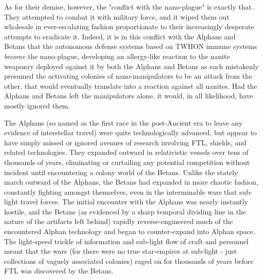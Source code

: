 As for their demise, however, the "conflict with the nano-plague" is
exactly that. They attempted to combat it with military force, and it
wiped them out wholesale in ever-escalating fashion proportionate to
their increasingly desperate attempts to eradicate it. Indeed, it is
in this conflict with the Alphans and Betans that the autonomous
defense systems based on TWHON immune systems {\em become} the
nano-plague, developing an allergy-like reaction to the nanite
weaponry deployed against it by both the Alphans and Betans as each
mistakenly presumed the activating colonies of nano-manipulators to be
an attack from the other, that would eventually translate into a
reaction against all nanites. Had the Alphans and Betans left the
manipulators alone, it would, in all likelihood, have mostly ignored
them.

The Alphans (so named as the first race in the post-Ancient era to
leave any evidence of interstellar travel) were quite technologically
advanced, but appear to have simply missed or ignored avenues of
research involving FTL, shields, and related technologies. They
expanded outward in relativistic vessels over tens of thousands of
years, eliminating or curtailing any potential competition without
incident until encountering a colony world of the Betans. Unlike the
stately march outward of the Alphans, the Betans had expanded in more
chaotic fashion, constantly fighting amongst themselves, even in the
interminable wars that sub-light travel forces. The initial encounter
with the Alphans was nearly instantly hostile, and the Betans (as
evidenced by a sharp temporal dividing line in the nature of the
artifacts left behind) rapidly reverse-engineered much of the
encountered Alphan technology and began to counter-expand into Alphan
space. The light-speed trickle of information and sub-light flow of
craft and personnel meant that the wars (for there were no true
star-empires at sub-light - just collections of vaguely associated
colonies) raged on for thousands of years before FTL was discovered by
the Betans.

